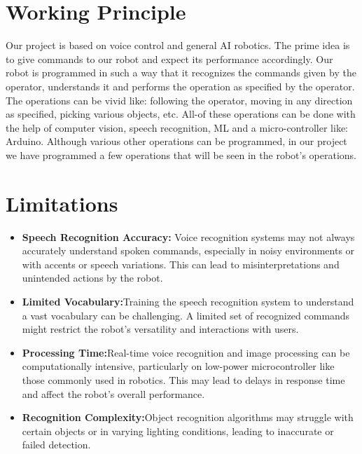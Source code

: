 \section{Working Principle}
Our project is based on voice control and general AI robotics. The prime idea is to give 
commands to our robot and expect its performance accordingly. Our robot is 
programmed in such a way that it recognizes the commands given by the operator, 
understands it and performs the operation as specified by the operator. The operations 
can be vivid like: following the operator, moving in any direction as specified, picking 
various objects, etc. All-of these operations can be done with the help of computer 
vision, speech recognition, ML and a micro-controller like: Arduino. Although various 
other operations can be programmed, in our project we have programmed a few 
operations that will be seen in the robot's operations.
\section{Limitations}
\begin{itemize}
    \item \textbf{Speech Recognition Accuracy:} Voice recognition systems may not always 
accurately understand spoken commands, especially in noisy environments or with 
accents or speech variations. This can lead to misinterpretations and unintended 
actions by the robot.
    \item \textbf{Limited Vocabulary:}Training the speech recognition system to understand a vast 
vocabulary can be challenging. A limited set of recognized commands might 
restrict the robot's versatility and interactions with users. 
    \item \textbf{ Processing Time:}Real-time voice recognition and image processing can be 
computationally intensive, particularly on low-power microcontroller like those 
commonly used in robotics. This may lead to delays in response time and affect 
the robot's overall performance.
    \item \textbf{Recognition Complexity:}Object recognition algorithms may struggle with certain 
objects or in varying lighting conditions, leading to inaccurate or failed detection.
\end{itemize}
